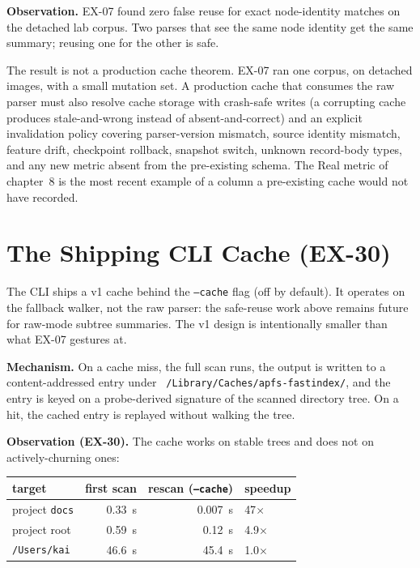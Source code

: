\textbf{Observation.} EX-07 found zero false reuse for exact
node-identity matches on the detached lab corpus. Two parses that
see the same node identity get the same summary; reusing one for
the other is safe.

The result is not a production cache theorem. EX-07 ran one corpus,
on detached images, with a small mutation set. A production cache
that consumes the raw parser must also resolve cache storage with
crash-safe writes (a corrupting cache produces
stale-and-wrong instead of absent-and-correct) and an explicit
invalidation policy covering parser-version mismatch, source
identity mismatch, feature drift, checkpoint rollback, snapshot
switch, unknown record-body types, and any new metric absent from
the pre-existing schema. The Real metric of chapter~8 is the most
recent example of a column a pre-existing cache would not have
recorded.

\section{The Shipping CLI Cache (EX-30)}

The CLI ships a v1 cache behind the \texttt{--cache} flag (off by
default). It operates on the fallback walker, not the raw parser:
the safe-reuse work above remains future for raw-mode subtree
summaries. The v1 design is intentionally smaller than what EX-07
gestures at.

\textbf{Mechanism.} On a cache miss, the full scan runs, the
output is written to a content-addressed entry under
\texttt{~/Library/Caches/apfs-fastindex/}, and the entry is keyed
on a probe-derived signature of the scanned directory tree. On a
hit, the cached entry is replayed without walking the tree.

\textbf{Observation (EX-30).} The cache works on stable trees and
does not on actively-churning ones:

\begin{center}
\begin{tabular}{lrrl}
\toprule
target & first scan & rescan (\texttt{--cache}) & speedup \\
\midrule
project \texttt{docs}     &  0.33~s &  0.007~s & 47$\times$ \\
project root              &  0.59~s &  0.12~s  & 4.9$\times$ \\
\texttt{/Users/kai}       & 46.6~s  & 45.4~s   & 1.0$\times$ \\
\bottomrule
\end{tabular}
\end{center}

